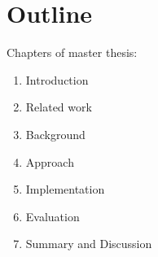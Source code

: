 \chapter{Outline}
\label{ch:outline}

Chapters of master thesis:
\begin{enumerate}
    \item Introduction
    \item Related work
    \item Background
    \item Approach
    \item Implementation
    \item Evaluation
    \item Summary and Discussion
\end{enumerate}
